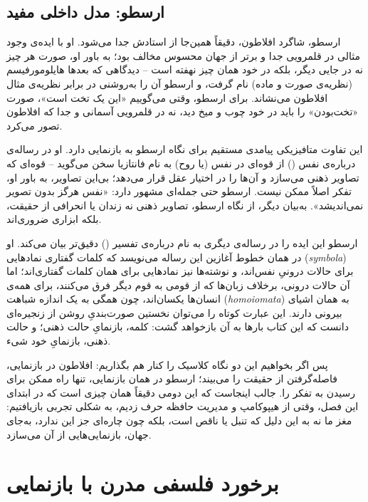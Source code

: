 \subsection{ارسطو: مدل داخلی مفید}
\label{sub:aristotle-model}

ارسطو، شاگرد افلاطون، دقیقاً همین‌جا از استادش جدا می‌شود. او با ایده‌ی وجود مثالی در قلمرویی جدا و برتر از جهان محسوس مخالف بود؛ به باور او، صورت هر چیز نه در جایی دیگر، بلکه در خود همان چیز نهفته است -- دیدگاهی که بعدها هایلومورفیسم (نظریه‌ی صورت و ماده) نام گرفت، و ارسطو آن را به‌روشنی در برابر نظریه‌ی مثال افلاطون می‌نشاند\autocite{sep-form-matter}. برای ارسطو، وقتی می‌گوییم «این یک تخت است»، صورت «تخت‌بودن» را باید در خود چوب و میخ دید، نه در قلمرویی آسمانی و جدا که افلاطون تصور می‌کرد.

این تفاوت متافیزیکی پیامدی مستقیم برای نگاه ارسطو به بازنمایی دارد. او در رساله‌ی درباره‌ی نفس () از قوه‌ای در نفس (یا روح) به نام فانتازیا سخن می‌گوید -- قوه‌ای که تصاویر ذهنی می‌سازد و آن‌ها را در اختیار عقل قرار می‌دهد؛ بی‌این تصاویر، به باور او، تفکر اصلاً ممکن نیست. ارسطو حتی جمله‌ای مشهور دارد: «نفس هرگز بدون تصویر نمی‌اندیشد»\autocite{aristotle-deanima}. به‌بیان دیگر، از نگاه ارسطو، تصاویر ذهنی نه زندان یا انحرافی از حقیقت، بلکه ابزاری ضروری‌اند.

ارسطو این ایده را در رساله‌ی دیگری به نام درباره‌ی تفسیر () دقیق‌تر بیان می‌کند. او در همان خطوط آغازین این رساله می‌نویسد که کلمات گفتاری نمادهایی (\textit{symbola}) برای حالات درونیِ نفس‌اند، و نوشته‌ها نیز نمادهایی برای همان کلمات گفتاری‌اند؛ اما آن حالات درونی، برخلاف زبان‌ها که از قومی به قوم دیگر فرق می‌کنند، برای همه‌ی انسان‌ها یکسان‌اند، چون همگی به یک اندازه شباهت (\textit{homoiomata}) به همان اشیای بیرونی دارند\autocite{aristotle-deinterpretatione}. این عبارت کوتاه را می‌توان نخستین صورت‌بندیِ روشن از زنجیره‌ای دانست که این کتاب بارها به آن بازخواهد گشت: کلمه، بازنمایِ حالت ذهنی؛ و حالت ذهنی، بازنمایِ خود شیء.

پس اگر بخواهیم این دو نگاه کلاسیک را کنار هم بگذاریم: افلاطون در بازنمایی، فاصله‌گرفتن از حقیقت را می‌بیند؛ ارسطو در همان بازنمایی، تنها راه ممکن برای رسیدن به تفکر را. جالب اینجاست که این دومی دقیقاً همان چیزی است که در ابتدای این فصل، وقتی از هیپوکامپ و مدیریت حافظه حرف زدیم، به شکلی تجربی بازیافتیم: مغز ما نه به این دلیل که تنبل یا ناقص است، بلکه چون چاره‌ای جز این ندارد، به‌جای جهان، بازنمایی‌هایی از آن می‌سازد.


\newpage
\section{برخورد فلسفی مدرن با بازنمایی}
\label{sec:modern-encounter}

